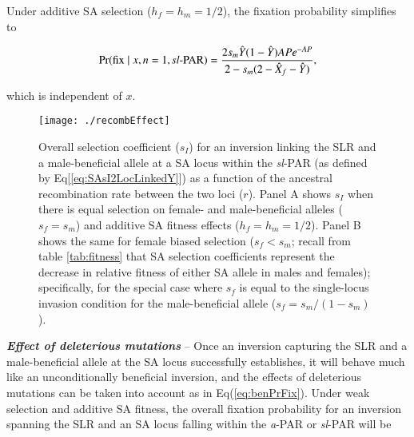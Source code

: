 \documentclass{article}[12pt]
\begin{document}
Under additive SA selection ($h_f = h_m = 1/2$), the fixation probability simplifies to

\begin{equation}\label{eq:SAsIpFix2LocLinked}
	\Pr(\text{fix} \mid x,n=1,\text{{\itshape sl}-PAR}) = \frac{ 2 s_m \hat{Y} (1 - \hat{Y}) A P e^{-A P}}{ 2 - s_m (2 - \hat{X}_f - \hat{Y}) },
\end{equation}

\noindent which is independent of $x$. \vspace{12pt}

\vspace{12pt}

 \begin{figure}[!htbp]
 \centering
 \texttt{[image: ./recombEffect]}
 \caption{Overall selection coefficient ($s_I$) for an inversion linking the SLR and a male-beneficial allele at a SA locus within the {\itshape sl}-PAR (as defined by Eq[\ref{eq:SAsI2LocLinkedY}]) as a function of the ancestral recombination rate between the two loci ($r$). Panel A shows $s_I$ when there is equal selection on female- and male-beneficial alleles ($s_f = s_m$) and additive SA fitness effects ($h_f = h_m = 1/2$). Panel B shows the same for female biased selection ($s_f < s_m$; recall from table \ref{tab:fitness} that SA selection coefficients represent the decrease in relative fitness of either SA allele in males and females); specifically, for the special case where $s_f$ is equal to the single-locus invasion condition for the male-beneficial allele ($s_f = s_m / (1 - s_m)$).}
 \label{fig:recombEffect}
 \end{figure}


{\bf \itshape Effect of deleterious mutations} -- Once an inversion capturing the SLR and a male-beneficial allele at the SA locus successfully establishes, it will behave much like an unconditionally beneficial inversion, and the effects of deleterious mutations can be taken into account as in Eq(\ref{eq:benPrFix}). Under weak selection and additive SA fitness, the overall fixation probability for an inversion spanning the SLR and an SA locus falling within the {\itshape a}-PAR or {\itshape sl}-PAR will be 
\end{document}
